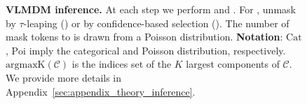 \begin{figure}[!t]
\caption{\textbf{VLMDM inference.} At each step we perform  and . For , unmask by $\tau$-leaping () or by confidence-based selection (). The number of mask tokens to  is drawn from a Poisson distribution. \textbf{Notation}: $\mathrm{Cat}$, $\mathrm{Poi}$ imply the categorical and Poisson distribution, respectively. $\mathrm{argmaxK}(\mathcal{C})$ is the indices set of the $K$ largest components of $\mathcal{C}$. We provide more details in Appendix~\ref{sec:appendix_theory_inference}.} \label{alg:inference}
\vspace{-0.2in}
\end{figure}
